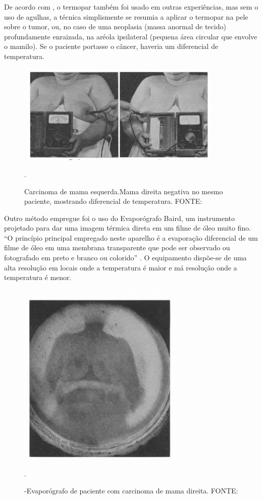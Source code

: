 De acordo com \cite{Lawson}, o termopar também foi usado em outras experiências, mas sem o uso de agulhas, a técnica simplismente se resumia a aplicar o termopar  na pele sobre o tumor, ou, no caso de uma neoplasia (massa anormal de tecido) profundamente enraizada, na aréola ipsilateral (pequena área circular que envolve o mamilo). Se o paciente portasse o câncer, haveria um diferencial de temperatura.
 
 
 \begin{figure}[h]
\centering
\includegraphics[width=10cm]{figuras/termopar_na_mama.png}
\caption{Carcinoma de mama esquerda.Mama direita negativa no mesmo paciente, mostrando
diferencial de temperatura. FONTE: \cite{Lawson}}.
\label{figura 2 :termopar na mama}
\end{figure}

   Outro método empregue foi o uso do Evaporógrafo Baird,  um instrumento projetado para dar uma imagem térmica direta em um filme de óleo muito fino. ``O princípio principal empregado neste aparelho é a evaporação diferencial de um filme de óleo em uma membrana transparente que
pode ser observado ou fotografado em preto e
branco ou colorido'' \cite[p.309]{Lawson}. O equipamento dispõe-se de uma alta resolução em locais onde a temperatura é maior e má resolução onde a temperatura é menor.

\begin{figure}[h]
\centering
\includegraphics[width=8cm]{figuras/Evaporografo.png}
\caption{-Evaporógrafo de paciente com carcinoma
de mama direita. FONTE: \cite{Lawson}}.
\label{figura 3:Evaporógrafo}
\end{figure}


